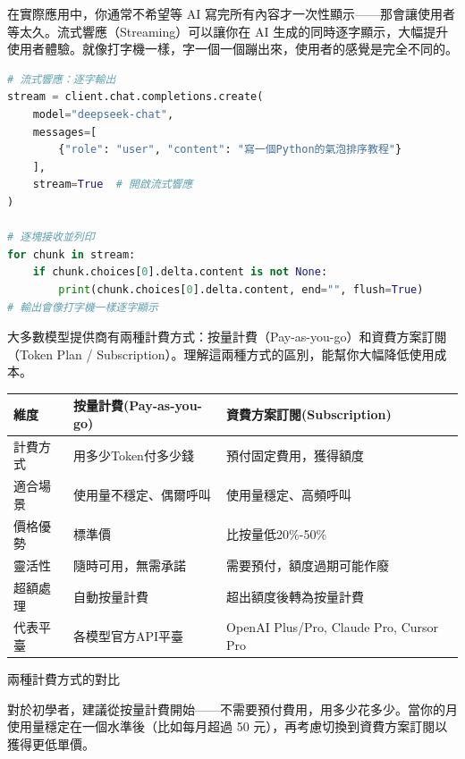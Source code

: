 
在實際應用中，你通常不希望等 AI 寫完所有內容才一次性顯示——那會讓使用者等太久。流式響應（Streaming）可以讓你在 AI 生成的同時逐字顯示，大幅提升使用者體驗。就像打字機一樣，字一個一個蹦出來，使用者的感覺是完全不同的。

\begin{lstlisting}[language=Python]
# 流式響應：逐字輸出
stream = client.chat.completions.create(
    model="deepseek-chat",
    messages=[
        {"role": "user", "content": "寫一個Python的氣泡排序教程"}
    ],
    stream=True  # 開啟流式響應
)

# 逐塊接收並列印
for chunk in stream:
    if chunk.choices[0].delta.content is not None:
        print(chunk.choices[0].delta.content, end="", flush=True)
# 輸出會像打字機一樣逐字顯示
\end{lstlisting}


大多數模型提供商有兩種計費方式：按量計費（Pay-as-you-go）和資費方案訂閱（Token Plan / Subscription）。理解這兩種方式的區別，能幫你大幅降低使用成本。


\begin{center}
\begin{tabularx}{\linewidth}{|X|X|X|}
\hline
\textbf{維度} & \textbf{按量計費(Pay-as-you-go)} & \textbf{資費方案訂閱(Subscription)} \tabularnewline
\hline
計費方式 & 用多少Token付多少錢 & 預付固定費用，獲得額度 \tabularnewline
適合場景 & 使用量不穩定、偶爾呼叫 & 使用量穩定、高頻呼叫 \tabularnewline
價格優勢 & 標準價 & 比按量低20\%-50\% \tabularnewline
靈活性 & 隨時可用，無需承諾 & 需要預付，額度過期可能作廢 \tabularnewline
超額處理 & 自動按量計費 & 超出額度後轉為按量計費 \tabularnewline
代表平臺 & 各模型官方API平臺 & OpenAI Plus/Pro, Claude Pro, Cursor Pro \tabularnewline
\hline
\end{tabularx}
\end{center}

\begin{center}\small\color{gray}兩種計費方式的對比\end{center}

對於初學者，建議從按量計費開始——不需要預付費用，用多少花多少。當你的月使用量穩定在一個水準後（比如每月超過 50 元），再考慮切換到資費方案訂閱以獲得更低單價。


